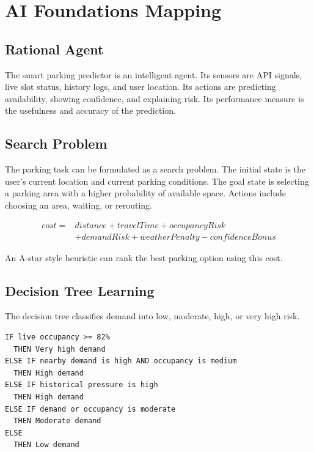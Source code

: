 \documentclass[12pt,a4paper]{article}
\begin{document}
\section{AI Foundations Mapping}
\label{sec:ai-foundations}

\subsection{Rational Agent}

The smart parking predictor is an intelligent agent. Its sensors are API signals, live slot status, history logs, and user location. Its actions are predicting availability, showing confidence, and explaining risk. Its performance measure is the usefulness and accuracy of the prediction.

\subsection{Search Problem}

The parking task can be formulated as a search problem. The initial state is the user's current location and current parking conditions. The goal state is selecting a parking area with a higher probability of available space. Actions include choosing an area, waiting, or rerouting.

\begin{equation}
\begin{split}
  cost ={}& distance + travelTime + occupancyRisk \\
          &+ demandRisk + weatherPenalty - confidenceBonus
\end{split}
\end{equation}

An A-star style heuristic can rank the best parking option using this cost.

\subsection{Decision Tree Learning}

The decision tree classifies demand into low, moderate, high, or very high risk.

\begin{lstlisting}
IF live occupancy >= 82%
  THEN Very high demand
ELSE IF nearby demand is high AND occupancy is medium
  THEN High demand
ELSE IF historical pressure is high
  THEN High demand
ELSE IF demand or occupancy is moderate
  THEN Moderate demand
ELSE
  THEN Low demand
\end{lstlisting}
\end{document}
